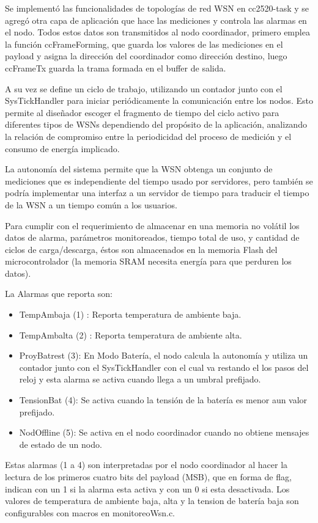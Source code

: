 {Se implementó las funcionalidades de topologías de red WSN en cc2520-task y se agregó otra capa de aplicación que hace las mediciones y controla las alarmas en el nodo. Todos estos datos son transmitidos al nodo coordinador, primero emplea la función ccFrameForming, que guarda los valores de las mediciones en el payload y asigna la dirección del coordinador como dirección destino, luego ccFrameTx guarda la trama formada en el buffer de salida.

A su vez se define un ciclo de trabajo, utilizando un contador junto con el SysTickHandler para iniciar periódicamente la comunicación entre los nodos. Esto permite al diseñador escoger el fragmento de tiempo del ciclo activo para diferentes tipos de WSNs dependiendo del propósito de la aplicación, analizando la relación de compromiso entre la periodicidad del proceso de medición y el consumo de energía implicado.

La autonomía del sistema permite que la WSN obtenga un conjunto de mediciones que es independiente del tiempo usado por servidores, pero también se podría implementar una interfaz a un servidor de tiempo para traducir el tiempo de la WSN a un tiempo común a los usuarios.

Para cumplir con el requerimiento de almacenar en una memoria no volátil los datos de alarma, parámetros monitoreados, tiempo total de uso, y cantidad de ciclos de carga/descarga, éstos son almacenados en la memoria Flash del microcontrolador (la memoria SRAM necesita energía para que perduren los datos). 

\noindent La Alarmas que reporta son:
	\begin{itemize}
	\item TempAmbaja (1) : Reporta temperatura de ambiente baja.
	\item TempAmbalta (2) : Reporta temperatura de ambiente alta.
	\item ProyBatrest (3): En Modo Batería, el nodo calcula la autonomía y utiliza un contador junto con el SysTickHandler con el cual va restando el los pasos del reloj y esta alarma se activa cuando llega a un umbral prefijado.
	\item TensionBat (4): Se activa cuando la tensión de la batería es menor aun valor prefijado.
	\item NodOffline (5): Se activa en el nodo coordinador cuando no obtiene mensajes de estado de un nodo.
	\end{itemize}
	
Estas alarmas (1 a 4) son interpretadas por el nodo coordinador al hacer la lectura de los primeros cuatro bits del payload (MSB), que en forma de flag, indican con un 1 si la alarma esta activa y con un 0 si esta desactivada. Los valores de temperatura de ambiente baja, alta y la tension de batería baja son configurables con macros en monitoreoWsn.c.

}

